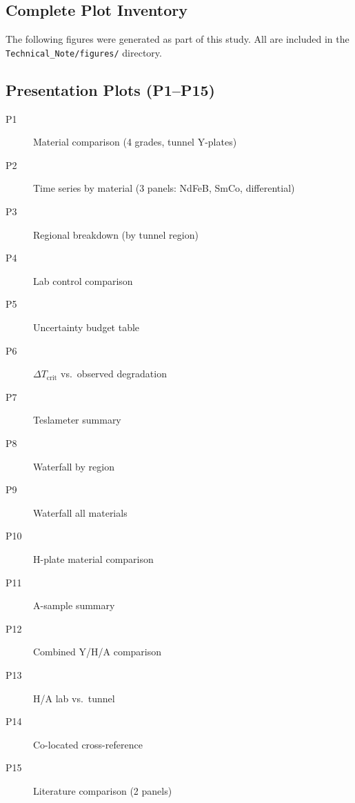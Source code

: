 \documentclass[11pt,letterpaper]{article}
\begin{document}
\begin{appendices}

\section{Complete Plot Inventory}
\label{app:plots}

The following figures were generated as part of this study. All are included
in the \texttt{Technical\_Note/figures/} directory.

\subsection{Presentation Plots (P1--P15)}
\begin{description}
    \item[P1] Material comparison (4 grades, tunnel Y-plates)
    \item[P2] Time series by material (3 panels: NdFeB, SmCo, differential)
    \item[P3] Regional breakdown (by tunnel region)
    \item[P4] Lab control comparison
    \item[P5] Uncertainty budget table
    \item[P6] $\Delta T_\mathrm{crit}$ vs.\ observed degradation
    \item[P7] Teslameter summary
    \item[P8] Waterfall by region
    \item[P9] Waterfall all materials
    \item[P10] H-plate material comparison
    \item[P11] A-sample summary
    \item[P12] Combined Y/H/A comparison
    \item[P13] H/A lab vs.\ tunnel
    \item[P14] Co-located cross-reference
    \item[P15] Literature comparison (2 panels)
\end{description}


\end{appendices}
\end{document}
